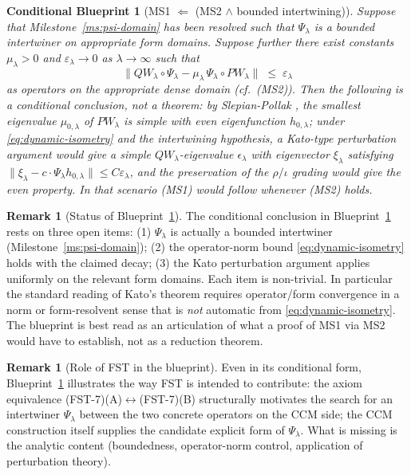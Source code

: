 \documentclass[11pt,a4paper]{article}
\theoremstyle{plain}
\newtheorem{blueprint}[theorem]{Conditional Blueprint}
\theoremstyle{definition}
\newtheorem{remark}[theorem]{Remark}
\begin{document}
\begin{blueprint}[MS1 $\Leftarrow$ (MS2 $\wedge$ bounded intertwining)]
\label{bp:fst-transfer}
Suppose that Milestone~\ref{ms:psi-domain} has been resolved such
that $\Psi_\lambda$ is a bounded intertwiner on appropriate form
domains.  Suppose further there exist constants $\mu_\lambda > 0$
and $\varepsilon_\lambda \to 0$ as $\lambda \to \infty$ such that
\begin{equation}\label{eq:dynamic-isometry}
  \big\| QW_\lambda \circ \Psi_\lambda
    - \mu_\lambda \, \Psi_\lambda \circ PW_\lambda \big\|
  \;\le\; \varepsilon_\lambda
\end{equation}
as operators on the appropriate dense domain (cf.~(MS2)).  Then the
following is a conditional conclusion, not a theorem: by
Slepian-Pollak \cite{SlepianPollack1961}, the smallest eigenvalue
$\mu_{0,\lambda}$ of $PW_\lambda$ is simple with even eigenfunction
$h_{0,\lambda}$; under \eqref{eq:dynamic-isometry} and the
intertwining hypothesis, a Kato-type perturbation argument
\cite{Kato} would give a simple $QW_\lambda$-eigenvalue
$\epsilon_\lambda$ with eigenvector $\xi_\lambda$ satisfying
$\|\xi_\lambda - c \cdot \Psi_\lambda h_{0,\lambda}\| \le
C \varepsilon_\lambda$, and the preservation of the $\rho/\iota$
grading would give the even property.  In that scenario
(MS1) would follow whenever (MS2) holds.
\end{blueprint}

\begin{remark}[Status of Blueprint~\ref{bp:fst-transfer}]
\label{rem:blueprint-caveats}
The conditional conclusion in Blueprint~\ref{bp:fst-transfer} rests
on three open items: (1) $\Psi_\lambda$ is actually a bounded
intertwiner (Milestone~\ref{ms:psi-domain}); (2) the operator-norm
bound \eqref{eq:dynamic-isometry} holds with the claimed decay; (3)
the Kato perturbation argument applies uniformly on the relevant
form domains.  Each item is non-trivial.  In particular the
standard reading of Kato's theorem requires operator/form
convergence in a norm or form-resolvent sense that is \emph{not}
automatic from \eqref{eq:dynamic-isometry}.  The blueprint is best
read as an articulation of what a proof of MS1 via MS2 would have to
establish, not as a reduction theorem.
\end{remark}

\begin{remark}[Role of FST in the blueprint]\label{rem:fst-contribution}
Even in its conditional form, Blueprint~\ref{bp:fst-transfer}
illustrates the way FST is intended to contribute: the axiom
equivalence (FST-7)(A)$\leftrightarrow$(FST-7)(B) structurally
motivates the search for an intertwiner $\Psi_\lambda$ between the
two concrete operators on the CCM side; the CCM construction itself
supplies the candidate explicit form of $\Psi_\lambda$.  What is
missing is the analytic content (boundedness, operator-norm
control, application of perturbation theory).
\end{remark}
\end{document}
